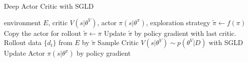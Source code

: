 \begin{algorithm}[htbp]
   \caption{Deep Actor Critic with SGLD}
   \label{alg:sgldac}
\begin{algorithmic}
    environment $E$, critic $V(s|\theta^V)$, actor $\pi(s|\theta^\pi)$, exploration strategy $\tilde\pi \leftarrow f(\pi)$
   \STATE Copy the actor for rollout $\tilde \pi\leftarrow \pi$
   \STATE Update $\tilde\pi$ by policy gradient with last critic.
   \ENDFOR
   \STATE Rollout data $\{d_t\}$ from $E$ by $\tilde\pi$
   \STATE Sample Critic $V(s|\theta^V) \sim p(\theta^V|D)$ with SGLD
   \STATE Update Actor $\pi(s|\theta^\pi)$ by policy gradient 
   \ENDFOR
   \ENDFOR
\end{algorithmic}
\end{algorithm}
